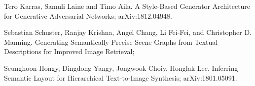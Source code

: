 \documentclass{article}
\begin{document}
\begin{thebibliography}{1}
Tero Karras, Samuli Laine and Timo Aila.
\newblock A Style-Based Generator Architecture for Generative Adversarial Networks;
\newblock arXiv:1812.04948.

Sebastian Schuster, Ranjay Krishna, Angel Chang,
Li Fei-Fei, and Christopher D. Manning.
\newblock Generating Semantically Precise Scene Graphs from Textual Descriptions for Improved Image Retrieval;

Seunghoon Hongy, Dingdong Yangy, Jongwook Choiy, Honglak Lee.
\newblock Inferring Semantic Layout for Hierarchical Text-to-Image Synthesis;
\newblock arXiv:1801.05091.


\end{thebibliography}

% 
\end{document}
